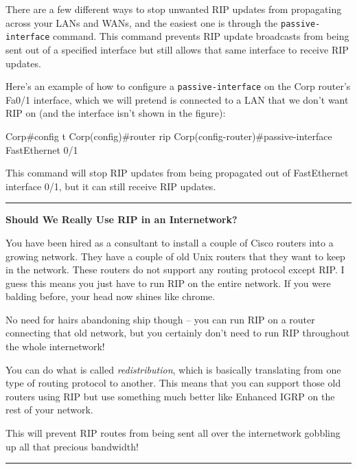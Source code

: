 \protect\hypertarget{c09.xhtmlux5cux23Page_397}{}{}There are a few
different ways to stop unwanted RIP updates from propagating across your
LANs and WANs, and the easiest one is through the
\texttt{passive-interface} command. This command prevents RIP update
broadcasts from being sent out of a specified interface but still allows
that same interface to receive RIP updates.

Here's an example of how to configure a \texttt{passive-interface} on
the Corp router's Fa0/1 interface, which we will pretend is connected to
a LAN that we don't want RIP on (and the interface isn't shown in the
figure):

\begin{cli}
Corp#config t
Corp(config)#router rip
Corp(config-router)#passive-interface FastEthernet 0/1
\end{cli}

This command will stop RIP updates from being propagated out of
FastEthernet interface 0/1, but it can still receive RIP updates.

\begin{center}\rule{0.5\linewidth}{0.5pt}\end{center}

\textbf{Should We Really Use RIP in an Internetwork?}

You have been hired as a consultant to install a couple of Cisco routers
into a growing network. They have a couple of old Unix routers that they
want to keep in the network. These routers do not support any routing
protocol except RIP. I guess this means you just have to run RIP on the
entire network. If you were balding before, your head now shines like
chrome.

No need for hairs abandoning ship though -- you can run RIP on a router
connecting that old network, but you certainly don't need to run RIP
throughout the whole internetwork!

You can do what is called \emph{redistribution}, which is basically
translating from one type of routing protocol to another. This means
that you can support those old routers using RIP but use something much
better like Enhanced IGRP on the rest of your network.

This will prevent RIP routes from being sent all over the internetwork
gobbling up all that precious bandwidth!

\begin{center}\rule{0.5\linewidth}{0.5pt}\end{center}

